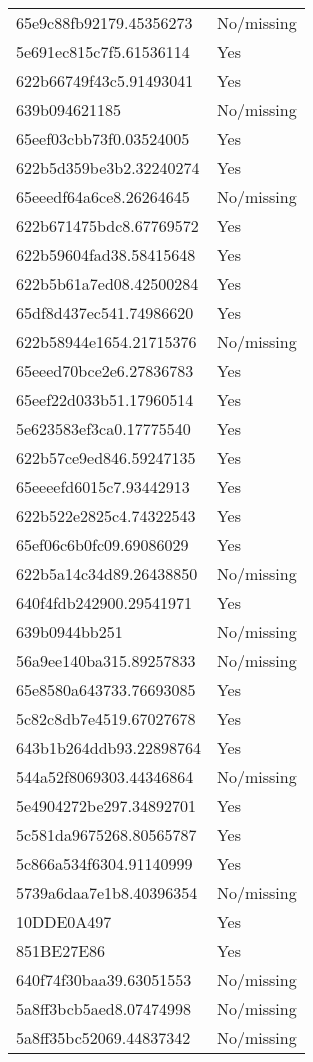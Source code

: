 \begin{tabular}{ll}
65e9c88fb92179.45356273 & No/missing \\
5e691ec815c7f5.61536114 & Yes \\
622b66749f43c5.91493041 & Yes \\
639b094621185 & No/missing \\
65eef03cbb73f0.03524005 & Yes \\
622b5d359be3b2.32240274 & Yes \\
65eeedf64a6ce8.26264645 & No/missing \\
622b671475bdc8.67769572 & Yes \\
622b59604fad38.58415648 & Yes \\
622b5b61a7ed08.42500284 & Yes \\
65df8d437ec541.74986620 & Yes \\
622b58944e1654.21715376 & No/missing \\
65eeed70bce2e6.27836783 & Yes \\
65eef22d033b51.17960514 & Yes \\
5e623583ef3ca0.17775540 & Yes \\
622b57ce9ed846.59247135 & Yes \\
65eeeefd6015c7.93442913 & Yes \\
622b522e2825c4.74322543 & Yes \\
65ef06c6b0fc09.69086029 & Yes \\
622b5a14c34d89.26438850 & No/missing \\
640f4fdb242900.29541971 & Yes \\
639b0944bb251 & No/missing \\
56a9ee140ba315.89257833 & No/missing \\
65e8580a643733.76693085 & Yes \\
5c82c8db7e4519.67027678 & Yes \\
643b1b264ddb93.22898764 & Yes \\
544a52f8069303.44346864 & No/missing \\
5e4904272be297.34892701 & Yes \\
5c581da9675268.80565787 & Yes \\
5c866a534f6304.91140999 & Yes \\
5739a6daa7e1b8.40396354 & No/missing \\
10DDE0A497 & Yes \\
851BE27E86 & Yes \\
640f74f30baa39.63051553 & No/missing \\
5a8ff3bcb5aed8.07474998 & No/missing \\
5a8ff35bc52069.44837342 & No/missing \\

\end{tabular}
